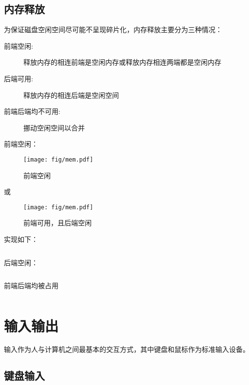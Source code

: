 \documentclass{swfcthesis}
\begin{document}
		\begin{listing}[H]
		\inputminted[tabsize=2, firstline=68, lastline=80,
		linenos=true]{c}{../ZOS/src/kernel/memory.c}
		\end{listing}

		\subsection{内存释放}
		为保证磁盘空闲空间尽可能不呈现碎片化，内存释放主要分为三种情况：
		\begin{description}
			\item[前端空闲:]释放内存的相连前端是空闲内存或释放内存相连两端都是空闲内存
			\item[后端可用:]释放内存的相连后端是空闲空间
			\item[前端后端均不可用:]挪动空闲空间以合并
		\end{description}

		前端空闲：	
		\begin{figure}[!ht]
		\centering
		\texttt{[image: fig/mem.pdf]}
		\caption{前端空闲}
		\label{fig:hello}
		\end{figure}
		或
		\begin{figure}[!ht]
		\centering
		\texttt{[image: fig/mem.pdf]}
		\caption{前端可用，且后端空闲}
		\label{fig:hello}
		\end{figure}
		实现如下：
		\begin{listing}[H]
		\inputminted[tabsize=2, firstline=97, lastline=117,
		linenos=true]{c}{../ZOS/src/kernel/memory.c}
		\end{listing}

		后端空闲：
		\begin{listing}[H]
		\inputminted[tabsize=2, firstline=118, lastline=127,
		linenos=true]{c}{../ZOS/src/kernel/memory.c}
		\end{listing}

		前端后端均被占用
		\begin{listing}[H]
		\inputminted[tabsize=2, firstline=128, lastline=141,
		linenos=true]{c}{../ZOS/src/kernel/memory.c}
		\end{listing}

    \section{输入输出}
	
		输入作为人与计算机之间最基本的交互方式，其中键盘和鼠标作为标准输入设备。
		\subsection{键盘输入}
\end{document}

